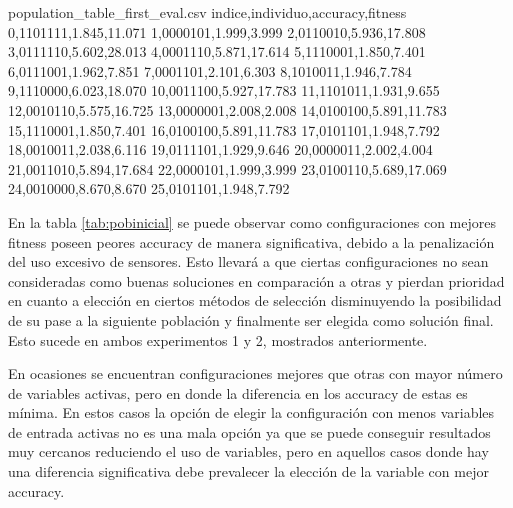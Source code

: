 \begin{filecontents*}{population_table_first_eval.csv}
indice,individuo,accuracy,fitness
0,1101111,1.845,11.071
1,0000101,1.999,3.999
2,0110010,5.936,17.808
3,0111110,5.602,28.013
4,0001110,5.871,17.614
5,1110001,1.850,7.401
6,0111001,1.962,7.851
7,0001101,2.101,6.303
8,1010011,1.946,7.784
9,1110000,6.023,18.070
10,0011100,5.927,17.783
11,1101011,1.931,9.655
12,0010110,5.575,16.725
13,0000001,2.008,2.008
14,0100100,5.891,11.783
15,1110001,1.850,7.401
16,0100100,5.891,11.783
17,0101101,1.948,7.792
18,0010011,2.038,6.116
19,0111101,1.929,9.646
20,0000011,2.002,4.004
21,0011010,5.894,17.684
22,0000101,1.999,3.999
23,0100110,5.689,17.069
24,0010000,8.670,8.670
25,0101101,1.948,7.792
\end{filecontents*}


\begin{table}[h!]
    \centering
    \begin{adjustbox}{max width=\textwidth}
    \end{adjustbox}
    \caption{Población inicial ejecución algoritmo}
    \label{tab:pobinicial}
\end{table}

\newpage
En la tabla \ref{tab:pobinicial} se puede observar como configuraciones con mejores fitness poseen peores accuracy de manera significativa, debido a la penalización del uso excesivo de sensores. Esto llevará a que ciertas configuraciones no sean consideradas como buenas soluciones en comparación a otras y pierdan prioridad en cuanto a elección en ciertos métodos de selección disminuyendo la posibilidad de su pase a la siguiente población y finalmente ser elegida como solución final. Esto sucede en ambos experimentos 1 y 2, mostrados anteriormente.

En ocasiones se encuentran configuraciones mejores que otras con mayor número de variables activas, pero en donde la diferencia en los accuracy de estas es mínima. En estos casos la opción de elegir la configuración con menos variables de entrada activas no es una mala opción ya que se puede conseguir resultados muy cercanos reduciendo el uso de variables, pero en aquellos casos donde hay una diferencia significativa debe prevalecer la elección de la variable con mejor accuracy.

